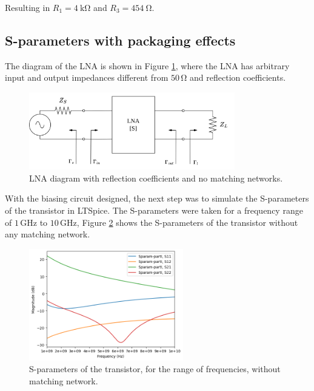 Resulting in $R_1 = \SI{4}{\kilo\ohm}$ and $R_3 = \SI{454}{\ohm}$.

\subsection{S-parameters with packaging effects}

The diagram of the LNA is shown in Figure \ref{fig:LNA-diagram-no-match}, where the LNA has arbitrary input and output impedances different from $50\,\si{\ohm}$ and reflection coefficients.

\begin{figure}[H]
    \centering
    \includegraphics[width=0.8\textwidth]{Images/LNA-diagram-no-match.png}
    \caption{LNA diagram with reflection coefficients and no matching networks.}
    \label{fig:LNA-diagram-no-match}
\end{figure}

With the biasing circuit designed, the next step was to simulate the S-parameters of the transistor in LTSpice.  The S-parameters were taken for a frequency range of $1\,\si{\giga\hertz}$ to $10\,\si{\giga\hertz}$, Figure \ref{fig:withoutmathing} shows the S-parameters of the transistor without any matching network.

\begin{figure}[H]
    \centering
    \includegraphics[width=0.6\textwidth]{Images/without-matching.png}
    \caption{S-parameters of the transistor, for the range of frequencies, without matching network.}
    \label{fig:withoutmathing}
\end{figure}


